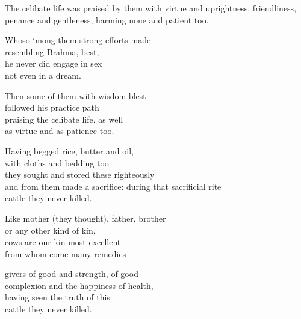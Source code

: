 \begin{MyDescription}{}
The celibate life was praised by them
with virtue and uprightness,
friendliness, penance and gentleness,
harming none and patient too.
\end{MyDescription}  

\begin{MyDescription}{}
Whoso `mong them strong efforts made\\
resembling Brahma, best,\\
he never did engage in sex\\
not even in a dream.
\end{MyDescription}     
  
\begin{MyDescription}{}
Then some of them with wisdom blest\\
followed his practice path\\
praising the celibate life, as well\\
as virtue and as patience too.
\end{MyDescription}   

\begin{MyDescription}{}
Having begged rice, butter and oil,\\
with cloths and bedding too\\
they sought and stored these righteously\\
and from them made a sacrifice:
during that sacrificial rite\\
cattle they never killed.\\
\end{MyDescription}   

\begin{MyDescription}{}
Like mother (they thought), father, brother\\
or any other kind of kin,\\
cows are our kin most excellent\\
from whom come many remedies --
\end{MyDescription}   
   
\begin{MyDescription}{}
givers of good and strength, of good\\
complexion and the happiness of health,\\
having seen the truth of this\\
cattle they never killed.\\
\end{MyDescription}  

